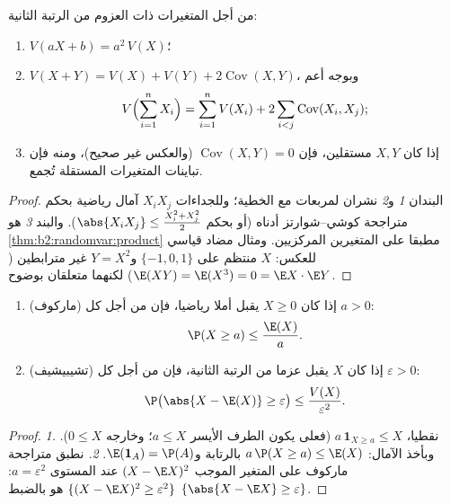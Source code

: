 \begin{theorem}\label{thm:b2:randomvar:variancerules}
من أجل المتغيرات ذات العزوم من الرتبة الثانية:
\begin{enumerate}
\item $V(aX + b) = a^2\,V(X)$؛
\item $V(X + Y) = V(X) + V(Y) + 2\operatorname{Cov}(X, Y)$، وبوجه أعم
\[
V\Bigl(\sum_{i=1}^n X_i\Bigr)
= \sum_{i=1}^n V(X_i)
+ 2\sum_{i < j}\operatorname{Cov}(X_i, X_j) ;
\]
\item إذا كان $X, Y$ مستقلين، فإن $\operatorname{Cov}(X, Y) = 0$ (والعكس غير صحيح)، ومنه
فإن تباينات المتغيرات المستقلة تُجمع.
\end{enumerate}
\end{theorem}

\begin{proof}
البندان \emph{1} و\emph{2} نشران لمربعات مع الخطية؛ وللجداءات $X_iX_j$
آمال رياضية بحكم متراجحة كوشي--شوارتز أدناه (أو بحكم $\abs{X_iX_j} \leq \frac{X_i^2 + X_j^2}{2}$). والبند
\emph{3} هو \cref{thm:b2:randomvar:product} مطبقا على المتغيرين المركزيين. ومثال مضاد قياسي
للعكس: $X$ منتظم على $\{-1, 0, 1\}$ و$Y = X^2$ غير مترابطين ($\E(XY) = \E(X^3) = 0 = \E X \cdot \E Y$) لكنهما
متعلقان بوضوح.
\end{proof}

\begin{theorem}\label{thm:b2:randomvar:markov}
\leavevmode
\begin{enumerate}
\item (ماركوف) إذا كان $X \geq 0$ يقبل أملا رياضيا، فإن من أجل كل $a
> 0$:
\[
\P(X \geq a) \leq \frac{\E(X)}{a} .
\]
\item (تشيبيشيف) إذا كان $X$ يقبل عزما من الرتبة الثانية، فإن من
أجل كل $\varepsilon > 0$:
\[
\P\bigl(\abs{X - \E(X)} \geq \varepsilon\bigr)
\leq \frac{V(X)}{\varepsilon^2} .
\]
\end{enumerate}
\end{theorem}

\begin{proof}
\emph{1.} نقطيا، $a\,\mathbf{1}_{X \geq a} \leq X$ (فعلى  يكون الطرف الأيسر $a \leq X$؛ وخارجه
$0 \leq X$). وبأخذ الآمال: $a\,\P(X \geq a) \leq \E(X)$ بالرتابة و$\E(\mathbf{1}_A) = \P(A)$.
\emph{2.} نطبق متراجحة ماركوف على المتغير الموجب $(X - \E
X)^2$ عند المستوى
$a = \varepsilon^2$:  $\{(X - \E X)^2
\geq \varepsilon^2\}$ هو بالضبط $\{\abs{X - \E X} \geq
\varepsilon\}$.
\end{proof}

